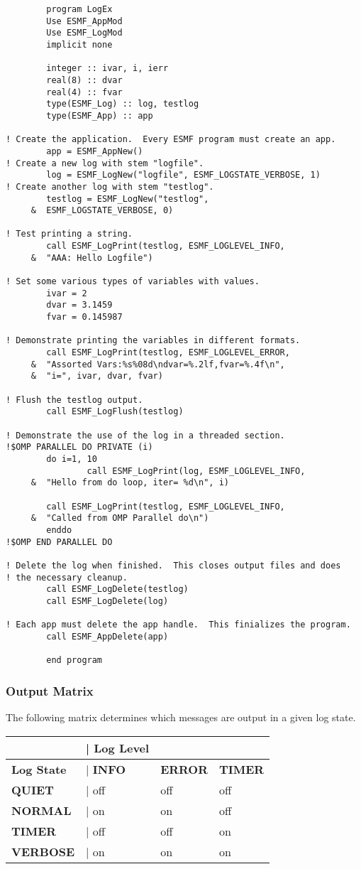 \begin{verbatim}
        program LogEx
        Use ESMF_AppMod
        Use ESMF_LogMod
        implicit none

        integer :: ivar, i, ierr
        real(8) :: dvar 
        real(4) :: fvar 
        type(ESMF_Log) :: log, testlog
        type(ESMF_App) :: app

! Create the application.  Every ESMF program must create an app.
        app = ESMF_AppNew()
! Create a new log with stem "logfile".
        log = ESMF_LogNew("logfile", ESMF_LOGSTATE_VERBOSE, 1)
! Create another log with stem "testlog".
        testlog = ESMF_LogNew("testlog",
     &  ESMF_LOGSTATE_VERBOSE, 0)

! Test printing a string.
        call ESMF_LogPrint(testlog, ESMF_LOGLEVEL_INFO,
     &  "AAA: Hello Logfile")

! Set some various types of variables with values.
        ivar = 2
        dvar = 3.1459
        fvar = 0.145987

! Demonstrate printing the variables in different formats.
        call ESMF_LogPrint(testlog, ESMF_LOGLEVEL_ERROR,
     &  "Assorted Vars:%s%08d\ndvar=%.2lf,fvar=%.4f\n",
     &  "i=", ivar, dvar, fvar)

! Flush the testlog output.
        call ESMF_LogFlush(testlog)
        
! Demonstrate the use of the log in a threaded section.
!$OMP PARALLEL DO PRIVATE (i)
        do i=1, 10 
                call ESMF_LogPrint(log, ESMF_LOGLEVEL_INFO,
     &  "Hello from do loop, iter= %d\n", i)

        call ESMF_LogPrint(testlog, ESMF_LOGLEVEL_INFO, 
     &  "Called from OMP Parallel do\n")
        enddo
!$OMP END PARALLEL DO

! Delete the log when finished.  This closes output files and does
! the necessary cleanup.
        call ESMF_LogDelete(testlog)
        call ESMF_LogDelete(log)

! Each app must delete the app handle.  This finializes the program.
        call ESMF_AppDelete(app)

        end program 
\end{verbatim}

\subsubsection{Output Matrix}

The following matrix determines which messages are output in a given log state.
\smallskip
\noindent
\begin{tabular}{|p{1.5in}p{1.0in}p{1.0in}p{1.0in}|} \hline
                  &| {\bf Log Level} & & \\ \hline
{\bf Log State}   &| {\bf INFO }& {\bf ERROR } & {\bf TIMER} \\ \hline
{\bf QUIET}       &| off & off & off \\ \hline
{\bf NORMAL}      &| on & on & off \\ \hline
{\bf TIMER}       &| off & off & on \\ \hline
{\bf VERBOSE}     &| on & on  & on  \\ \hline
\end{tabular}

